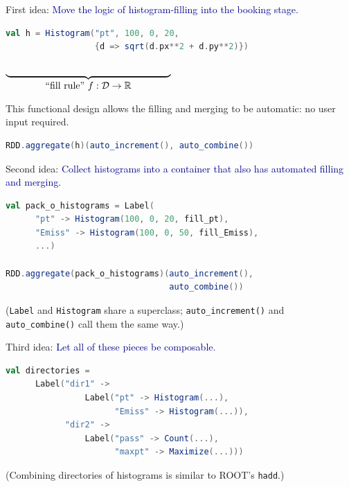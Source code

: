 \documentclass{beamer}
\begin{document}
\begin{frame}[fragile]{First idea:}
\textcolor{darkblue}{\large Move the logic of histogram-filling into the booking stage.}

\begin{lstlisting}[language=scala]
val h = Histogram("pt", 100, 0, 20,
                  {d => sqrt(d.px**2 + d.py**2)})
\end{lstlisting}

\vspace{-\baselineskip} \hfill $\underbrace{\mbox{\hspace{6.0 cm}}}_{\mbox{``fill rule'' } {\displaystyle f: \mathcal{D} \to \mathbb{R}}}$ \hspace{0.7 cm}

\vfill
This functional design allows the filling and merging to be automatic: no user input required.

\begin{lstlisting}[language=scala]
RDD.aggregate(h)(auto_increment(), auto_combine())
\end{lstlisting}
\end{frame}

\begin{frame}[fragile]{Second idea:}
\textcolor{darkblue}{\large Collect histograms into a container that also has automated filling and merging.}

\begin{lstlisting}[language=scala]
val pack_o_histograms = Label(
      "pt" -> Histogram(100, 0, 20, fill_pt),
      "Emiss" -> Histogram(100, 0, 50, fill_Emiss),
      ...)

RDD.aggregate(pack_o_histograms)(auto_increment(),
                                 auto_combine())
\end{lstlisting}

\vfill
({\tt \small Label} and {\tt \small Histogram} share a superclass; {\tt \small auto\_increment()} and {\tt \small auto\_combine()} call them the same way.)
\end{frame}

\begin{frame}[fragile]{Third idea:}
\vspace{0.5 cm}
\textcolor{darkblue}{\large Let all of these pieces be composable.}

\begin{lstlisting}[language=scala]
val directories =
      Label("dir1" ->
                Label("pt" -> Histogram(...),
                      "Emiss" -> Histogram(...)),
            "dir2" ->
                Label("pass" -> Count(...),
                      "maxpt" -> Maximize(...)))
\end{lstlisting}

\vspace{1.5 cm}
(Combining directories of histograms is similar to ROOT's {\tt \small hadd}.)
\end{frame}
\end{document}
